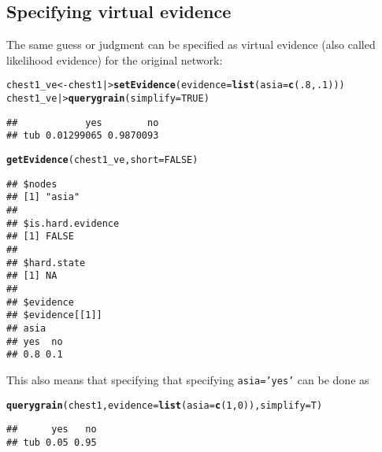 \documentclass[10pt]{article}\usepackage[]{graphicx}\usepackage[]{xcolor}
\makeatletter
\newcommand{\hlnum}[1]{\textcolor[rgb]{0.686,0.059,0.569}{#1}}%
\newcommand{\hlstd}[1]{\textcolor[rgb]{0.345,0.345,0.345}{#1}}%
\newcommand{\hlkwb}[1]{\textcolor[rgb]{0.69,0.353,0.396}{#1}}%
\newcommand{\hlkwc}[1]{\textcolor[rgb]{0.333,0.667,0.333}{#1}}%
\newcommand{\hlkwd}[1]{\textcolor[rgb]{0.737,0.353,0.396}{\textbf{#1}}}%
\newenvironment{kframe}{%
 \def\at@end@of@kframe{}%
 \ifinner\ifhmode%
  \def\at@end@of@kframe{\end{minipage}}%
  \begin{minipage}{\columnwidth}%
 \fi\fi%
 \def\FrameCommand##1{\hskip\@totalleftmargin \hskip-\fboxsep
 \colorbox{shadecolor}{##1}\hskip-\fboxsep
     \hskip-\linewidth \hskip-\@totalleftmargin \hskip\columnwidth}%
 \MakeFramed {\advance\hsize-\width
   \@totalleftmargin\z@ \linewidth\hsize
   \@setminipage}}%
 {\par\unskip\endMakeFramed%
 \at@end@of@kframe}
\newenvironment{knitrout}{}{} %
\def\code#1{{\texttt{#1}}}
\makeatother
\begin{document}
\subsection{Specifying virtual evidence}
\label{sec:spec-virt-evid}

The same guess or judgment can be specified as virtual evidence
(also called likelihood evidence) for the original network:

\begin{knitrout}
\color{fgcolor}\begin{kframe}
\begin{alltt}
\hlstd{chest1_ve} \hlkwb{<-} \hlstd{chest1 |>} \hlkwd{setEvidence}\hlstd{(}\hlkwc{evidence}\hlstd{=}\hlkwd{list}\hlstd{(}\hlkwc{asia}\hlstd{=}\hlkwd{c}\hlstd{(}\hlnum{.8}\hlstd{,} \hlnum{.1}\hlstd{)))}
\hlstd{chest1_ve |>} \hlkwd{querygrain}\hlstd{(}\hlkwc{simplify} \hlstd{=} \hlnum{TRUE}\hlstd{)}
\end{alltt}
\begin{verbatim}
##            yes        no
## tub 0.01299065 0.9870093
\end{verbatim}
\begin{alltt}
\hlkwd{getEvidence}\hlstd{(chest1_ve,} \hlkwc{short}\hlstd{=}\hlnum{FALSE}\hlstd{)}
\end{alltt}
\begin{verbatim}
## $nodes
## [1] "asia"
## 
## $is.hard.evidence
## [1] FALSE
## 
## $hard.state
## [1] NA
## 
## $evidence
## $evidence[[1]]
## asia
## yes  no 
## 0.8 0.1
\end{verbatim}
\end{kframe}
\end{knitrout}

This also means that specifying that specifying \code{asia='yes'} can
be done as
\begin{knitrout}
\color{fgcolor}\begin{kframe}
\begin{alltt}
\hlkwd{querygrain}\hlstd{(chest1,} \hlkwc{evidence}\hlstd{=}\hlkwd{list}\hlstd{(}\hlkwc{asia}\hlstd{=}\hlkwd{c}\hlstd{(}\hlnum{1}\hlstd{,} \hlnum{0}\hlstd{)),} \hlkwc{simplify}\hlstd{=T)}
\end{alltt}
\begin{verbatim}
##      yes   no
## tub 0.05 0.95
\end{verbatim}
\end{kframe}
\end{knitrout}
\end{document}
